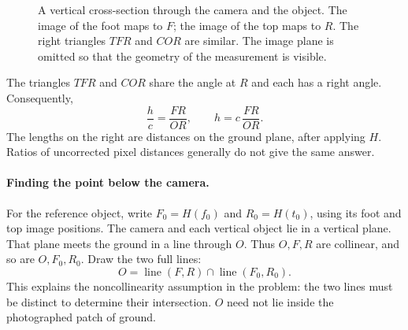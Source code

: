 \begin{figure}[htbp]\centering
{}
\caption{A vertical cross-section through the camera and the object.
The image of the foot maps to $F$; the image of the top maps to $R$.
The right triangles $TFR$ and $COR$ are similar. The image plane is omitted
so that the geometry of the measurement is visible.}
\label{fig:geo-camera-triangles}
\end{figure}

The triangles $TFR$ and $COR$ share the angle at $R$ and each has a right
angle. Consequently,
\[
\frac{h}{c}=\frac{FR}{OR},\qquad h=c\,\frac{FR}{OR}.
\]
The lengths on the right are distances on the ground plane, after applying
$H$. Ratios of uncorrected pixel distances generally do not give the same answer.

\paragraph{Finding the point below the camera.}
For the reference object, write $F_0=H(f_0)$ and $R_0=H(t_0)$, using its
foot and top image positions. The camera and each vertical object lie in
a vertical plane. That plane meets the ground in a line through $O$.
Thus $O,F,R$ are collinear, and so are $O,F_0,R_0$. Draw the two full lines:
\[
O=\operatorname{line}(F,R)\cap\operatorname{line}(F_0,R_0).
\]
This explains the noncollinearity assumption in the problem: the two
lines must be distinct to determine their intersection. $O$ need not
lie inside the photographed patch of ground.

